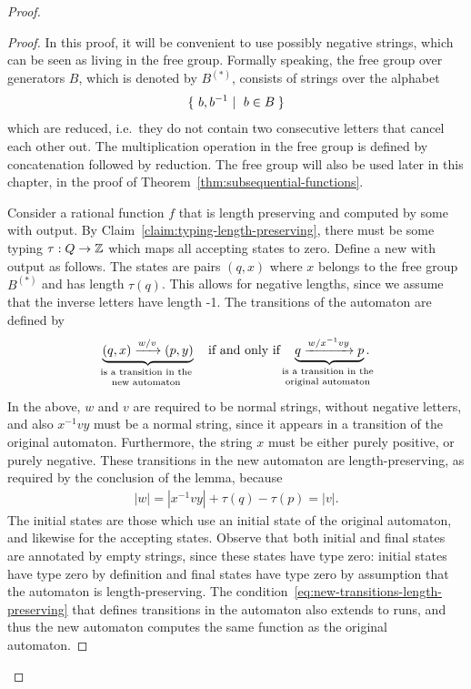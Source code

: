 \begin{proof}
    \begin{proof}
        In this proof, it will be convenient to use possibly negative strings, which can be seen as living in the free group. Formally speaking, the free group over generators $B$, which is denoted by $B^{(*)}$, consists of strings over the alphabet \begin{align*}\setbuild{ b, b^{-1}}{$b \in B$}\end{align*} which are reduced, i.e.~they do not contain two consecutive letters that cancel each other out. The multiplication operation in the free group is defined by concatenation followed by reduction. The free group will also be used later in this chapter, in the proof of Theorem~\ref{thm:subsequential-functions}.

        Consider a rational function $f$ that is length preserving and computed by some \nfa with output. By Claim~\ref{claim:typing-length-preserving}, there must be some typing $\tau : Q \to {\mathbb Z}$ which maps all accepting states to zero. Define a new \nfa with output as follows. The  states are pairs $(q, x)$ where $x$ belongs to the free group $B^{(*)}$ and has length $\tau(q)$. This allows for negative lengths, since we assume that the inverse letters have length -1.  The transitions of the automaton are defined by  
        \begin{align}\label{eq:new-transitions-length-preserving}
         \myunderbrace{(q,x) \xrightarrow { w / v} (p,y)}{is a transition in the \\ new automaton} \quad \text{if and only if} \quad         \myunderbrace{q \xrightarrow { w / x^{-1} v y} p}{is a transition in the \\ original automaton}.
        \end{align}
        In the above, $w$ and $v$ are required to be normal strings, without negative letters, and also $x^{-1} v y$ must be a normal string, since it appears in a transition of the original automaton. Furthermore, the string $x$ must be either purely positive, or purely negative. 
        These transitions in the new automaton are length-preserving, as required by the conclusion of  the lemma, because 
        \begin{align*}
        |w| = |x^{-1} v y| + \tau(q) - \tau(p) = |v|.
        \end{align*}
        The initial states are those which use an initial state of the original automaton, and likewise for the accepting states. Observe that both initial and final states are annotated by empty strings, since these states have type zero: initial states have type zero by definition and final states have type zero by assumption that the automaton is length-preserving. The condition~\eqref{eq:new-transitions-length-preserving} that defines transitions in the automaton also extends to runs, and thus the new automaton computes the same function as the original automaton.
    \end{proof}


\end{proof}
